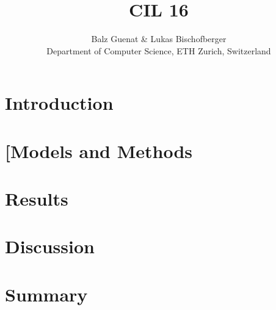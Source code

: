 \documentclass[10pt,conference,compsocconf]{IEEEtran}
\begin{document}
\title{CIL 16}

\author{
 Balz Guenat \& Lukas Bischofberger\\
  Department of Computer Science, ETH Zurich, Switzerland
}

\maketitle

\begin{abstract}
  
\end{abstract}

\section{Introduction}


\section{[Models and Methods}


\section{Results}


\section{Discussion}



\section{Summary}




\end{document}
